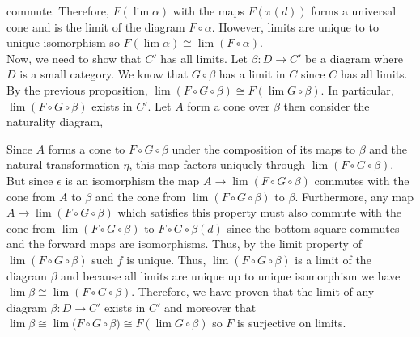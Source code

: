 \documentclass[12pt]{extarticle}
\begin{document}
commute. Therefore, $F(\lim{\alpha})$ with the maps $F(\pi(d))$ forms a universal cone and is the limit of the diagram $F \circ \alpha$. However, limits are unique to to unique isomorphism so $F(\lim{\alpha}) \cong \lim{(F \circ \alpha)}$.
\bigskip\\
Now, we need to show that $C'$ has all limits. Let $\beta : D \to C'$ be a diagram where $D$ is a small category. We know that $G \circ \beta$ has a limit in $C$ since $C$ has all limits. By the previous proposition, $\lim{(F \circ G \circ \beta)} \cong F(\lim{G \circ \beta})$. In particular, $\lim{(F \circ G \circ \beta)}$ exists in $C'$. Let $A$ form a cone over $\beta$ then consider the naturality diagram, 
\begin{center}
\end{center}
Since $A$ forms a cone to $F \circ G \circ \beta$ under the composition of its maps to $\beta$ and the natural transformation $\eta$, this map factors uniquely through $\lim{(F \circ G \circ \beta)}$. But since $\epsilon$ is an isomorphism the map $A \to \lim{(F \circ G \circ \beta)}$ commutes with the cone from $A$ to $\beta$ and the cone from $\lim{(F \circ G \circ \beta)}$ to $\beta$. Furthermore, any map $A \to \lim{(F \circ G \circ \beta)}$ which satisfies this property must also commute with the cone from $\lim{(F \circ G \circ \beta)}$ to $F \circ G \circ \beta(d)$ since the bottom square commutes and the forward maps are isomorphisms. Thus, by the limit property of $\lim{(F \circ G \circ \beta)}$ such $f$ is unique. Thus, $\lim{(F \circ G \circ \beta)}$ is a limit of the diagram $\beta$ and because all limits are unique up to unique isomorphism we have $\lim{\beta} \cong \lim{(F \circ G \circ \beta)}$. Therefore, we have proven that the limit of any diagram $\beta : D \to C'$ exists in $C'$ and moreover that $\lim{\beta} \cong \lim{(F \circ G \circ \beta}) \cong F(\lim{G \circ \beta})$ so $F$ is surjective on limits.   
\end{document}
